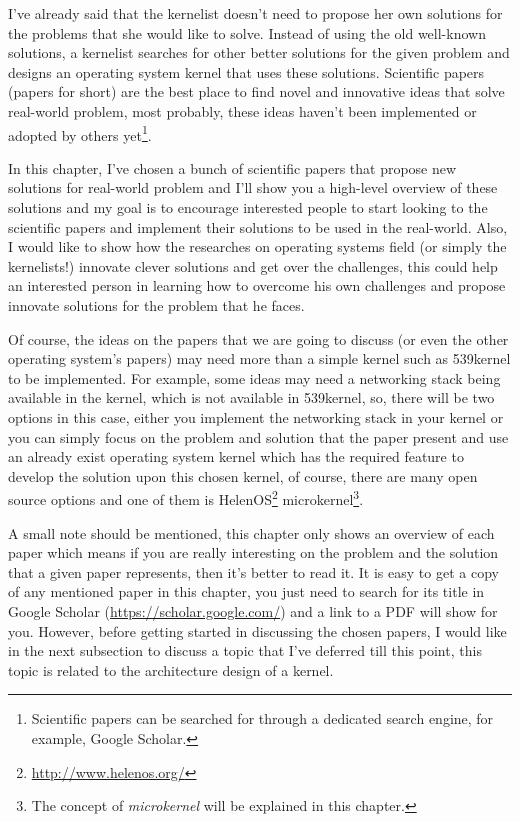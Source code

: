 I've already said that the kernelist doesn't need to propose her own
solutions for the problems that she would like to solve. Instead of
using the old well-known solutions, a kernelist searches for other
better solutions for the given problem and designs an operating system
kernel that uses these solutions. Scientific papers (papers for short)
are the best place to find novel and innovative ideas that solve
real-world problem, most probably, these ideas haven't been implemented
or adopted by others yet\footnote{Scientific papers can be searched for
  through a dedicated search engine, for example, Google Scholar.}.

In this chapter, I've chosen a bunch of scientific papers that propose
new solutions for real-world problem and I'll show you a high-level
overview of these solutions and my goal is to encourage interested
people to start looking to the scientific papers and implement their
solutions to be used in the real-world. Also, I would like to show how
the researches on operating systems field (or simply the kernelists!)
innovate clever solutions and get over the challenges, this could help
an interested person in learning how to overcome his own challenges and
propose innovate solutions for the problem that he faces.

Of course, the ideas on the papers that we are going to discuss (or even
the other operating system's papers) may need more than a simple kernel
such as 539kernel to be implemented. For example, some ideas may need a
networking stack being available in the kernel, which is not available
in 539kernel, so, there will be two options in this case, either you
implement the networking stack in your kernel or you can simply focus on
the problem and solution that the paper present and use an already exist
operating system kernel which has the required feature to develop the
solution upon this chosen kernel, of course, there are many open source
options and one of them is HelenOS\footnote{\url{http://www.helenos.org/}}
microkernel\footnote{The concept of \emph{microkernel} will be explained
  in this chapter.}.

A small note should be mentioned, this chapter only shows an overview of
each paper which means if you are really interesting on the problem and
the solution that a given paper represents, then it's better to read it.
It is easy to get a copy of any mentioned paper in this chapter, you
just need to search for its title in Google Scholar
(\url{https://scholar.google.com/}) and a link to a PDF will show for
you. However, before getting started in discussing the chosen papers, I
would like in the next subsection to discuss a topic that I've deferred
till this point, this topic is related to the architecture design of a
kernel.

